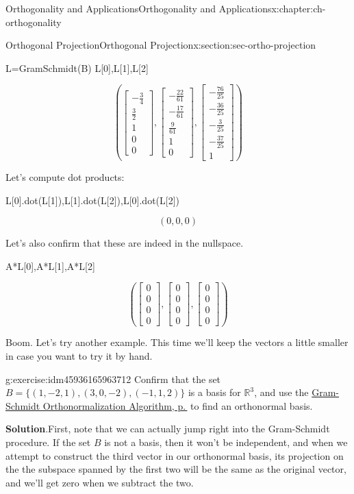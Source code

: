 \documentclass[oneside,10pt,]{book}
\newcommand{\blocktitlefont}{\relax}
\numberwithin{equation}{section}
\newcommand{\bbm}{\begin{bmatrix}}
\newcommand{\ebm}{\end{bmatrix}}
\newcommand{\R}{\mathbb{R}}
\begin{document}
\begin{chapterptx}{Orthogonality and Applications}{}{Orthogonality and Applications}{}{}{x:chapter:ch-orthogonality}
\begin{sectionptx}{Orthogonal Projection}{}{Orthogonal Projection}{}{}{x:section:sec-ortho-projection}
\begin{sageinput}
L=GramSchmidt(B)
L[0],L[1],L[2]
\end{sageinput}
\begin{sageoutput}
\[\left(\bbm -\frac34\\ \frac32\\1\\0\\0\ebm, \bbm -\frac{22}{61}\\-\frac{17}{61}\\ \frac{9}{61}\\1\\0\ebm, \bbm -\frac{76}{25}\\-\frac{36}{25}\\-\frac{3}{25}\\-\frac{37}{25}\\1\ebm\right)\]
\end{sageoutput}
Let's compute dot products:%
\begin{sageinput}
L[0].dot(L[1]),L[1].dot(L[2]),L[0].dot(L[2])
\end{sageinput}
\begin{sageoutput}
\[(0,0,0)\]
\end{sageoutput}
Let's also confirm that these are indeed in the nullspace.%
\begin{sageinput}
A*L[0],A*L[1],A*L[2]
\end{sageinput}
\begin{sageoutput}
\[\left(\bbm 0\\0\\0\\0\ebm, \bbm 0\\0\\0\\0\ebm, \bbm 0\\0\\0\\0\ebm\right)\]
\end{sageoutput}
Boom. Let's try another example. This time we'll keep the vectors a little smaller in case you want to try it by hand.%
\begin{inlineexercise}{}{g:exercise:idm45936165963712}%
Confirm that the set \(B=\{(1,-2,1), (3,0,-2), (-1,1,2)\}\) is a basis for \(\R^3\), and use the \hyperref[x:theorem:thm-gram-schmidt]{Gram-Schmidt Orthonormalization Algorithm, p.\,\pageref{x:theorem:thm-gram-schmidt}} to find an orthonormal basis.%
\par\smallskip%
\noindent\textbf{\blocktitlefont Solution}.\label{g:solution:idm45936165961232}{}\hypertarget{g:solution:idm45936165961232}{}\quad{}First, note that we can actually jump right into the Gram-Schmidt procedure. If the set \(B\) is not a basis, then it won't be independent, and when we attempt to construct the third vector in our orthonormal basis, its projection on the the subspace spanned by the first two will be the same as the original vector, and we'll get zero when we subtract the two.%

\end{inlineexercise}
\end{sectionptx}
\end{chapterptx}
\end{document}
